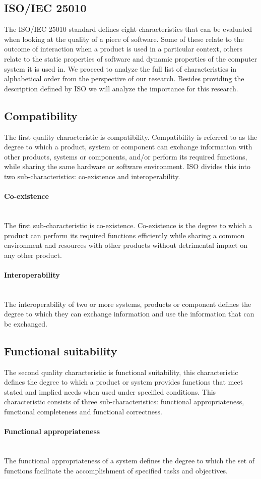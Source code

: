 \documentclass[twoside]{uva-inf-bachelor-thesis}
\newcommand{\myparagraph}[1]{\paragraph{#1}\mbox{}\\}
\begin{document}
\subsection{ISO/IEC 25010}
The ISO/IEC 25010 standard defines eight characteristics that can be evaluated when looking at the quality of a piece of software. Some of these relate to the outcome of interaction when a product is used in a particular context, others relate to the static properties of software and dynamic properties of the computer system it is used in. We proceed to analyze the full list of characteristics in alphabetical order from the perspective of our research. Besides providing the description defined by ISO we will analyze the importance for this research.

\subsection{Compatibility}
The first quality characteristic is compatibility. Compatibility is referred to as the degree to which a product, system or component can exchange information with other products, systems or components, and/or perform its required functions, while sharing the same hardware or software environment. ISO divides this into two sub-characteristics: co-existence and interoperability.

\myparagraph{Co-existence}
The first sub-characteristic is co-existence. Co-existence is the degree to which a product can perform its required functions efficiently while sharing a common environment and resources with other products without detrimental impact on any other product.

\myparagraph{Interoperability}
The interoperability of two or more systems, products or component defines the degree to which they can exchange information and use the information that can be exchanged.

\subsection{Functional suitability}
The second quality characteristic is functional suitability, this characteristic defines the degree to which a product or system provides functions that meet stated and implied needs when used under specified conditions. This characteristic consists of three sub-characteristics: functional appropriateness, functional completeness and functional correctness.

\myparagraph{Functional appropriateness}
The functional appropriateness of a system defines the degree to which the set of functions facilitate the accomplishment of specified tasks and objectives.
\end{document}
